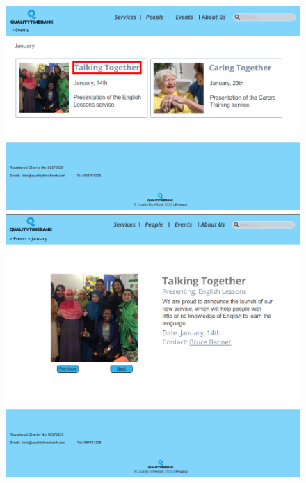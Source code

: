 \documentclass[a4paper, 11pt, parskip=half, headsepline]{scrreprt}
\begin{document}
\begin{figure}[H]
    \begin{minipage}[t]{0.5\textwidth}
        \centering
    	\includegraphics[width=1\linewidth, keepaspectratio]{scenarios/scenario-23}
    	\caption{}
    	\label{fig:scenario-23}
    \end{minipage}
    \hspace*{\fill}
    \begin{minipage}[t]{0.5\textwidth}
        \centering
    	\includegraphics[width=1\linewidth, keepaspectratio]{scenarios/scenario-24}
    	\caption{}
    	\label{fig:scenario-24}
    \end{minipage}
\end{figure}
\end{document}

